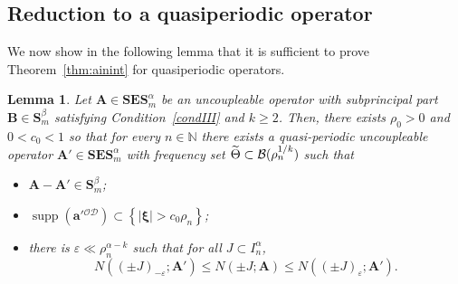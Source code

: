 \documentclass[10pt]{amsart}
\newtheorem{lemm}[theo]{Lemma}\newtheorem{prop}[theo]{Proposition}\newtheorem{coro}[theo]{Corollary}\newtheorem{conj}[theo]{Conjecture}
\theoremstyle{definition}\newtheorem{defi}[theo]{Definition}\newtheorem{rema}[theo]{Remark}\newtheorem{exam}[theo]{Example}\newtheorem{nota}[theo]{Notation}
\DeclareMathOperator{\supp}{supp}
\newcommand{\N}{\mathbb N}
\newcommand{\CB}{\mathcal{B}}
\newcommand{\CD}{\mathcal{D}}
\newcommand{\CO}{\mathcal{O}}
\newcommand{\bxi}{\boldsymbol \xi}
\newcommand{\ba}{\mathbf a}
\newcommand{\BA}{\mathbf A}
\newcommand{\BB}{\mathbf B}
\newcommand{\BE}{\mathbf E}
\newcommand{\BS}{\mathbf S}
\newcommand{\pd}{uncoupleable}
\newcommand{\eps}{\varepsilon}
\newcommand{\abs}[1]{\left\lvert #1 \right\rvert}
\newcommand{\set}[1]{\left\{ #1 \right\}}
\let\oldtilde\tilde
\renewcommand*{\tilde}[1]{\mathchoice{\widetilde{#1}}{\widetilde{#1}}{\oldtilde{#1}}{\oldtilde{#1}}}
\begin{document}
\subsection{Reduction to a quasiperiodic operator}

We now show in the following lemma that it is sufficient to prove Theorem~\ref{thm:ainint} for quasiperiodic operators.
\begin{lemm}\label{lem:qpenough}
Let $\BA \in \BS\BE\BS_m^\alpha$ be an \pd{} operator with subprincipal part $\BB
\in \BS^\beta_m$ satisfying Condition~\ref{condIII} and $k \ge 2$. Then, there exists $\rho_0 > 0$ and $0 < c_0 < 1$ so that for every $n \in \N$ there exists a quasi-periodic \pd{} operator $\BA' \in \BS\BE \BS_m^\alpha$ with frequency set $\tilde \Theta \subset
\CB(\rho_n^{1/k})$ such that
\begin{itemize}
\setlength
\itemsep{1em}
\item $\BA - \BA' \in \BS_m^\beta$;
\item $\supp(\ba'{}^{\CO\CD}) \subset \set{\abs{\bxi} > c_0 \rho_n}$;
\item there is $\eps \ll \rho_n^{\alpha-k}$ such that for all $J \subset I_n^\alpha$,
\begin{equation}\label{eq:qpapprox}
N((\pm J)_{-\eps};\BA') \le N(\pm J;\BA) \le N((\pm J)_\eps;\BA').
\end{equation}
\end{itemize}
\end{lemm}
\end{document}
